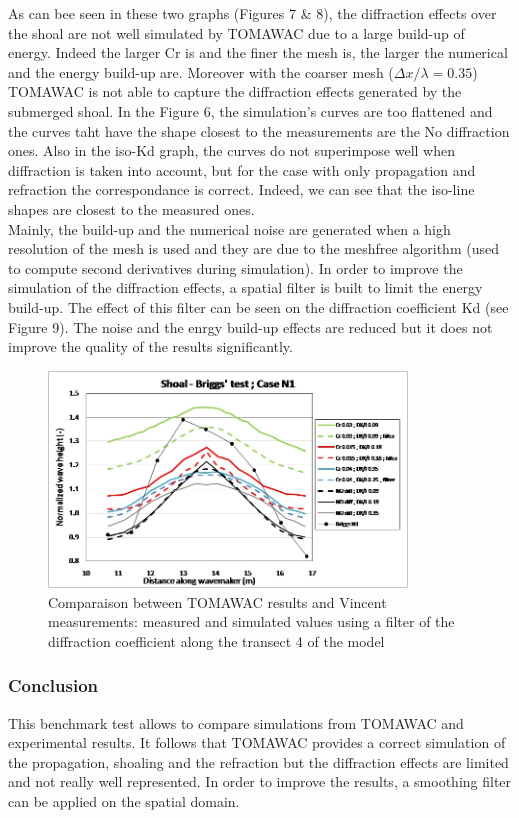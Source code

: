 As can bee seen in these two graphs (Figures 7 \& 8), the diffraction effects over the shoal are not well simulated by TOMAWAC due to a large build-up of energy. Indeed the larger Cr is and the finer the mesh is, the larger the numerical and the energy build-up are. Moreover with the coarser mesh ($\Delta x / \lambda = 0.35$) TOMAWAC is not able to capture the diffraction effects generated by the submerged shoal. In the Figure 6, the simulation's curves are too flattened and the curves taht have the shape closest to the measurements are the No diffraction ones. Also in the iso-Kd graph, the curves do not superimpose well when diffraction is taken into account, but for the case with only propagation and refraction the correspondance is correct. Indeed, we can see that the iso-line shapes are closest to the measured ones.\\
Mainly, the build-up and the numerical noise are generated when a high resolution of the mesh is used and they are due to the meshfree algorithm (used to compute second derivatives during simulation). 
In order to improve the simulation of the diffraction effects, a spatial filter is built to limit the energy build-up. The effect of this filter can be seen on the diffraction coefficient Kd (see Figure 9). The noise and the enrgy build-up effects are reduced but it does not improve the quality of the results significantly.\\

\begin{figure}[H]
  \centering
    \includegraphics[width=0.85\textwidth]{kd_filter.jpg}
      \caption{Comparaison between TOMAWAC results and Vincent measurements: measured and simulated values using a filter of the diffraction coefficient along the transect 4 of the model}
\end{figure}

\subsubsection{Conclusion}
This benchmark test allows to compare simulations from TOMAWAC and experimental results. It follows that TOMAWAC provides a correct simulation of the propagation, shoaling and the refraction but the diffraction effects are limited and not really well represented. In order to improve the results, a smoothing filter can be applied on the spatial domain.\\

